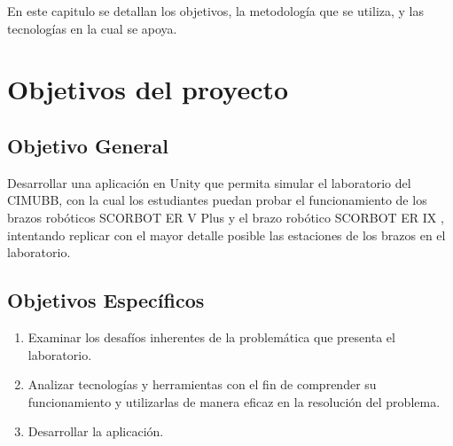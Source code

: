 En este capitulo se detallan los objetivos, la metodología que se utiliza, y las tecnologías en la cual se apoya.

\section{Objetivos del proyecto}

\subsection{Objetivo General}
Desarrollar una aplicación en Unity que permita simular el laboratorio
del CIMUBB, con la cual los estudiantes puedan probar el funcionamiento de los
brazos robóticos SCORBOT ER V Plus y el brazo robótico SCORBOT ER IX , intentando replicar con el mayor detalle posible
las estaciones de los brazos en el laboratorio.

\subsection{Objetivos Específicos}
\begin{enumerate}[label=\roman*.-]
\item Examinar los desafíos inherentes de la problemática que presenta el laboratorio.
\item Analizar tecnologías y herramientas con el fin de comprender su funcionamiento y utilizarlas de manera eficaz en la resolución del problema.
\item Desarrollar la aplicación.
\end{enumerate}

